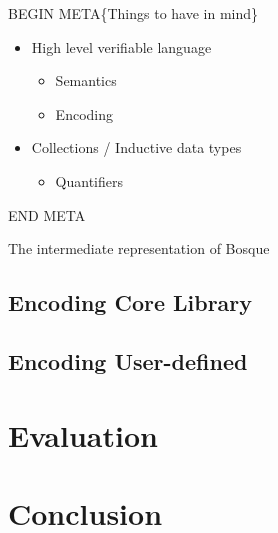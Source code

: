 \documentclass[runningheads]{llncs}
\begin{document}
BEGIN META\{Things to have in mind\}

\begin{itemize}
\item High level verifiable language
  \begin{itemize}
  \item Semantics
  \item Encoding
  \end{itemize}


\item Collections / Inductive data types
  \begin{itemize}
  \item Quantifiers
  \end{itemize}
\end{itemize}

END META

The intermediate representation of Bosque 

\subsection{Encoding Core Library}
\subsection{Encoding User-defined }
%
%

\section{Evaluation}

%
%

\section{Conclusion}

%
%



\end{document}
